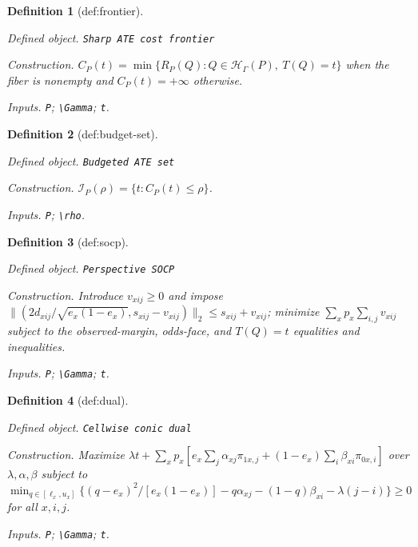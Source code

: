 \documentclass{article}
\newtheorem{definition}{Definition}
\begin{document}
\begin{definition}[def:frontier]\label{def:frontier}
\par\smallskip\noindent\emph{Defined object.} \texttt{Sharp ATE cost frontier}
\par\smallskip\noindent\emph{Construction.} \(C_P(t)=\min\{R_P(Q):Q\in\mathcal H_\Gamma(P),\ T(Q)=t\}\) when the fiber is nonempty and \(C_P(t)=+\infty\) otherwise.
\par\smallskip\noindent\emph{Inputs.} \texttt{P}; \texttt{\textbackslash{}\allowbreak{}Gamma}; \texttt{t}.
\end{definition}

\begin{definition}[def:budget-set]\label{def:budget-set}
\par\smallskip\noindent\emph{Defined object.} \texttt{Budgeted ATE set}
\par\smallskip\noindent\emph{Construction.} \(\mathcal I_P(\rho)=\{t:C_P(t)\leq\rho\}\).
\par\smallskip\noindent\emph{Inputs.} \texttt{P}; \texttt{\textbackslash{}\allowbreak{}rho}.
\end{definition}

\begin{definition}[def:socp]\label{def:socp}
\par\smallskip\noindent\emph{Defined object.} \texttt{Perspective SOCP}
\par\smallskip\noindent\emph{Construction.} Introduce \(v_{xij}\geq0\) and impose \(\|(2d_{xij}/\sqrt{e_x(1-e_x)},s_{xij}-v_{xij})\|_2\leq s_{xij}+v_{xij}\); minimize \(\sum_xp_x\sum_{i,j}v_{xij}\) subject to the observed-margin, odds-face, and \(T(Q)=t\) equalities and inequalities.
\par\smallskip\noindent\emph{Inputs.} \texttt{P}; \texttt{\textbackslash{}\allowbreak{}Gamma}; \texttt{t}.
\end{definition}

\begin{definition}[def:dual]\label{def:dual}
\par\smallskip\noindent\emph{Defined object.} \texttt{Cellwise conic dual}
\par\smallskip\noindent\emph{Construction.} Maximize \(\lambda t+\sum_xp_x[e_x\sum_j\alpha_{xj}\pi_{1x,j}+(1-e_x)\sum_i\beta_{xi}\pi_{0x,i}]\) over \(\lambda,\alpha,\beta\) subject to \(\min_{q\in[\ell_x,u_x]}\{(q-e_x)^2/[e_x(1-e_x)]-q\alpha_{xj}-(1-q)\beta_{xi}-\lambda(j-i)\}\geq0\) for all \(x,i,j\).
\par\smallskip\noindent\emph{Inputs.} \texttt{P}; \texttt{\textbackslash{}\allowbreak{}Gamma}; \texttt{t}.
\end{definition}
\end{document}
